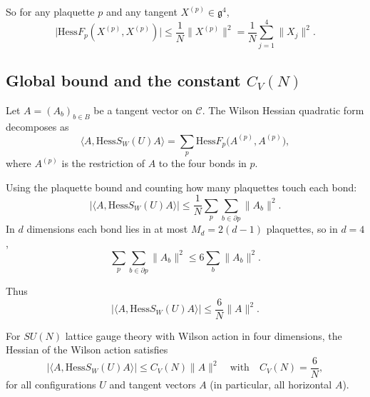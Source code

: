 So for any plaquette $p$ and any tangent $X^{(p)}\in \mathfrak{g}^4$,
\[
\big|\mathrm{Hess}F_p(X^{(p)},X^{(p)})\big|
\le \frac{1}{N} \|X^{(p)}\|^2
= \frac{1}{N} \sum_{j=1}^4 \|X_j\|^2.
\]

\subsection{Global bound and the constant $C_V(N)$}

Let $A = (A_b)_{b\in B}$ be a tangent vector on $\mathcal{C}$.
The Wilson Hessian quadratic form decomposes as
\[
\langle A, \mathrm{Hess} S_W(U) A\rangle
= \sum_p \mathrm{Hess}F_p\big(A^{(p)},A^{(p)}\big),
\]
where $A^{(p)}$ is the restriction of $A$ to the four bonds in $p$.

Using the plaquette bound and counting how many plaquettes touch each bond:
\[
\big|\langle A, \mathrm{Hess} S_W(U) A\rangle\big|
\le \frac{1}{N}\sum_p \sum_{b\in\partial p} \|A_b\|^2.
\]
In $d$ dimensions each bond lies in at most $M_d = 2(d-1)$ plaquettes,
so in $d=4$,
\[
\sum_p \sum_{b\in\partial p} \|A_b\|^2
\le 6\sum_b \|A_b\|^2.
\]

Thus
\[
\big|\langle A, \mathrm{Hess} S_W(U) A\rangle\big|
\le \frac{6}{N} \|A\|^2.
\]

\begin{theorem}
For $SU(N)$ lattice gauge theory with Wilson action in four dimensions,
the Hessian of the Wilson action satisfies
\[
\big|\langle A, \mathrm{Hess} S_W(U) A\rangle\big|
\le C_V(N) \|A\|^2
\quad\text{with}\quad
C_V(N) = \frac{6}{N},
\]
for all configurations $U$ and tangent vectors $A$ (in particular, all horizontal $A$).
\end{theorem}
